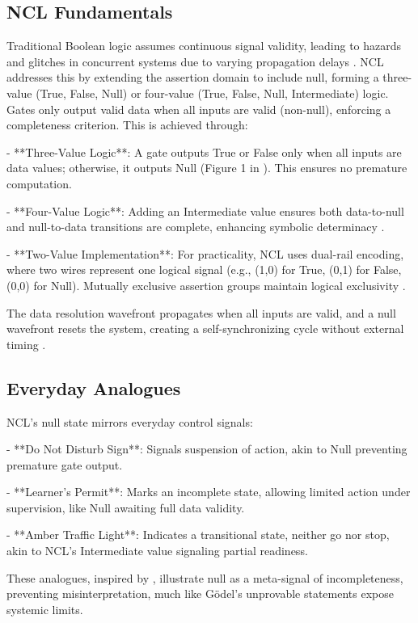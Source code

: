\documentclass{article}
\begin{document}
\subsection{NCL Fundamentals}
Traditional Boolean logic assumes continuous signal validity, leading to hazards and glitches in concurrent systems due to varying propagation delays \citep{fant2005}. NCL addresses this by extending the assertion domain to include null, forming a three-value (True, False, Null) or four-value (True, False, Null, Intermediate) logic. Gates only output valid data when all inputs are valid (non-null), enforcing a completeness criterion. This is achieved through:

- **Three-Value Logic**: A gate outputs True or False only when all inputs are data values; otherwise, it outputs Null (Figure 1 in \citet{fant2005}). This ensures no premature computation.

- **Four-Value Logic**: Adding an Intermediate value ensures both data-to-null and null-to-data transitions are complete, enhancing symbolic determinacy \citep{fant2005}.

- **Two-Value Implementation**: For practicality, NCL uses dual-rail encoding, where two wires represent one logical signal (e.g., (1,0) for True, (0,1) for False, (0,0) for Null). Mutually exclusive assertion groups maintain logical exclusivity \citep{fant2005}.

The data resolution wavefront propagates when all inputs are valid, and a null wavefront resets the system, creating a self-synchronizing cycle without external timing \citep{seitz1980}.

\subsection{Everyday Analogues}
NCL's null state mirrors everyday control signals:

- **Do Not Disturb Sign**: Signals suspension of action, akin to Null preventing premature gate output.

- **Learner's Permit**: Marks an incomplete state, allowing limited action under supervision, like Null awaiting full data validity.

- **Amber Traffic Light**: Indicates a transitional state, neither go nor stop, akin to NCL's Intermediate value signaling partial readiness.

These analogues, inspired by \citet{fant2005}, illustrate null as a meta-signal of incompleteness, preventing misinterpretation, much like Gödel's unprovable statements expose systemic limits.
\end{document}
